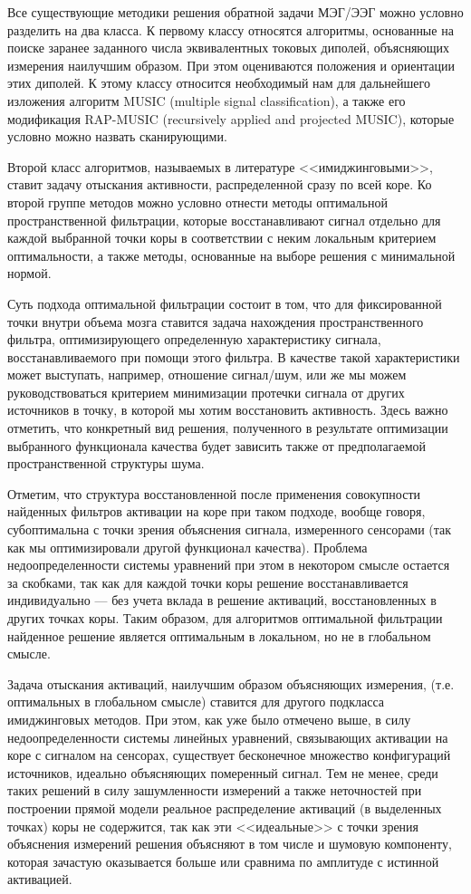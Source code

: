 Все существующие методики решения обратной задачи МЭГ/ЭЭГ можно условно
разделить на два класса.
К первому классу относятся алгоритмы, основанные на
поиске заранее заданного числа эквивалентных токовых диполей, объясняющих измерения
наилучшим образом. При этом оцениваются положения и ориентации этих диполей.
К этому классу относится необходимый нам для дальнейшего изложения алгоритм %
MUSIC (multiple signal classification), а также его модификация RAP-MUSIC
(recursively applied and projected MUSIC), которые условно можно назвать сканирующими.

Второй класс алгоритмов, называемых в литературе <<имиджинговыми>>, ставит задачу
отыскания активности, распределенной сразу по всей коре. Ко второй группе методов
можно условно отнести методы оптимальной пространственной фильтрации, которые
восстанавливают сигнал отдельно для каждой выбранной точки коры в соответствии
с неким локальным критерием оптимальности, а также методы, основанные на выборе
решения с минимальной нормой.

Суть подхода оптимальной фильтрации состоит в том, что для
фиксированной точки внутри объема мозга ставится задача нахождения
пространственного фильтра, оптимизирующего определенную характеристику сигнала,
восстанавливаемого при помощи этого фильтра. В качестве такой характеристики
может выступать, например, отношение сигнал/шум, или же мы можем
руководствоваться критерием минимизации протечки сигнала от других источников в
точку, в которой мы хотим восстановить активность.  Здесь важно отметить, что
конкретный вид решения, полученного в результате оптимизации выбранного
функционала качества будет зависить также от предполагаемой пространственной
структуры шума.

Отметим, что структура восстановленной после применения совокупности найденных
фильтров активации на коре при таком подходе, вообще говоря, субоптимальна с
точки зрения объяснения сигнала, измеренного сенсорами (так как мы
оптимизировали другой функционал качества). Проблема недоопределенности
системы уравнений при этом в некотором смысле остается за скобками, так как для
каждой точки коры решение восстанавливается индивидуально --- без учета вклада
в решение активаций, восстановленных в других точках коры.  Таким образом, для
алгоритмов оптимальной фильтрации найденное решение является
оптимальным в локальном, но не в глобальном смысле.

Задача отыскания активаций, наилучшим образом объясняющих измерения, (т.е.
оптимальных в глобальном смысле) ставится для другого подкласса имиджинговых
методов.
При этом, как уже было отмечено выше, в силу
недоопределенности системы линейных уравнений, связывающих активации на коре с
сигналом на сенсорах, существует бесконечное множество конфигураций источников,
идеально объясняющих померенный сигнал. Тем не менее, среди таких решений в
силу зашумленности измерений а также неточностей при построении прямой модели
реальное распределение активаций (в выделенных точках) коры не содержится, так
как эти <<идеальные>> с точки зрения объяснения измерений решения объясняют в том
числе и шумовую компоненту, которая зачастую оказывается больше или сравнима по
амплитуде с истинной активацией.

